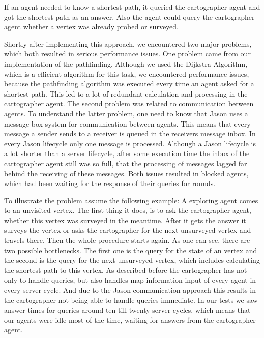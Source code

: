If an agent needed to know a shortest path, it queried the cartographer agent and got the shortest path as an answer. Also the agent could query the cartographer agent whether a vertex was already probed or surveyed. 

Shortly after implementing this approach, we encountered two major problems, which both resulted in serious performance issues. One problem came from our implementation of the pathfinding. Although we used the Dijkstra-Algorithm, which is a efficient algorithm for this task, we encountered performance issues, because the pathfinding algorithm was executed every time an agent asked for a shortest path. This led to a lot of redundant calculation and processing in the cartographer agent. 
The second problem was related to communication between agents. To understand the latter problem, one need to know that Jason uses a message box system for communication between agents. This means that every message a sender sends to a receiver is queued in the receivers message inbox. In every Jason lifecycle only one message is processed. Although a Jason lifecycle is a lot shorter than a server lifecycle, after some execution time the inbox of the cartographer agent still was so full, that the processing of messages lagged far behind the receiving of these messages. Both issues resulted in blocked agents, which had been waiting for the response of their queries for rounds. 

To illustrate the problem assume the following example: A exploring agent comes to an unvisited vertex. The first thing it does, is to ask the cartographer agent, whether this vertex was surveyed in the meantime. After it gets the answer it surveys the vertex or asks the cartographer for the next unsurveyed vertex and travels there. Then the whole procedure starts again. As one can see, there are two possible bottlenecks. The first one is the query for the state of an vertex and the second is the query for the next unsurveyed vertex, which includes calculating the shortest path to this vertex. As described before the cartographer has not only to handle queries, but also handles map information input of every agent in every server cycle. And due to the Jason communication approach this results in the cartographer not being able to handle queries immediate. In our tests we saw answer times for queries around ten till twenty server cycles, which means that our agents were idle most of the time, waiting for answers from the cartographer agent.

